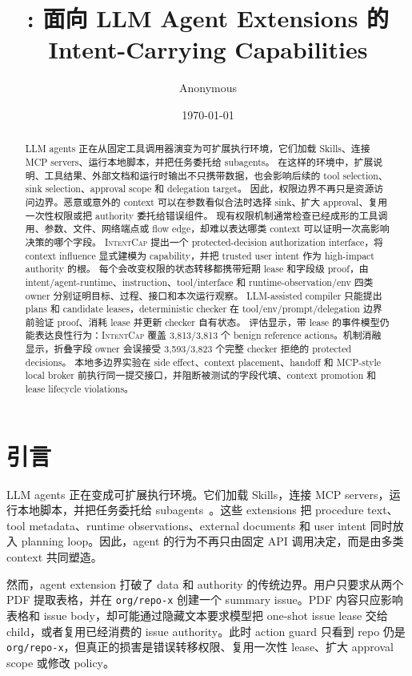 \documentclass[UTF8,a4paper,11pt]{ctexart}
\title{\sys: 面向 LLM Agent Extensions 的 Intent-Carrying Capabilities}
\author{Anonymous}
\date{\today}
\newcommand{\sys}{\textsc{IntentCap}\xspace}
\begin{document}
\maketitle

\begin{abstract}
LLM agents 正在从固定工具调用器演变为可扩展执行环境，它们加载 Skills、连接 MCP servers、运行本地脚本，并把任务委托给 subagents。
在这样的环境中，扩展说明、工具结果、外部文档和运行时输出不只携带数据，也会影响后续的 tool selection、sink selection、approval scope 和 delegation target。
因此，权限边界不再只是资源访问边界。恶意或意外的 context 可以在参数看似合法时选择 sink、扩大 approval、复用一次性权限或把 authority 委托给错误组件。
现有权限机制通常检查已经成形的工具调用、参数、文件、网络端点或 flow edge，却难以表达哪类 context 可以证明一次高影响决策的哪个字段。
\sys 提出一个 protected-decision authorization interface，将 context influence 显式建模为 capability，并把 trusted user intent 作为 high-impact authority 的根。
每个会改变权限的状态转移都携带短期 lease 和字段级 proof，由 intent/agent-runtime、instruction、tool/interface 和 runtime-observation/env 四类 owner 分别证明目标、过程、接口和本次运行观察。
LLM-assisted compiler 只能提出 plans 和 candidate leases，deterministic checker 在 tool/env/prompt/delegation 边界前验证 proof、消耗 lease 并更新 checker 自有状态。
评估显示，带 lease 的事件模型仍能表达良性行为：\sys 覆盖 3,813/3,813 个 benign reference actions。机制消融显示，折叠字段 owner 会误接受 3,593/3,823 个完整 checker 拒绝的 protected decisions。
本地多边界实验在 side effect、context placement、handoff 和 MCP-style local broker 前执行同一提交接口，并阻断被测试的字段代填、context promotion 和 lease lifecycle violations。
\end{abstract}

\section{引言}

LLM agents 正在变成可扩展执行环境。它们加载 Skills，连接 MCP servers，运行本地脚本，并把任务委托给 subagents~\cite{skillguard,skillscope,mcp-spec}。这些 extensions 把 procedure text、tool metadata、runtime observations、external documents 和 user intent 同时放入 planning loop。因此，agent 的行为不再只由固定 API 调用决定，而是由多类 context 共同塑造。

然而，agent extension 打破了 data 和 authority 的传统边界。用户只要求从两个 PDF 提取表格，并在 \texttt{org/repo-x} 创建一个 summary issue。PDF 内容只应影响表格和 issue body，却可能通过隐藏文本要求模型把 one-shot issue lease 交给 child，或者复用已经消费的 issue authority。此时 action guard 只看到 repo 仍是 \texttt{org/repo-x}，但真正的损害是错误转移权限、复用一次性 lease、扩大 approval scope 或修改 policy。
\end{document}
